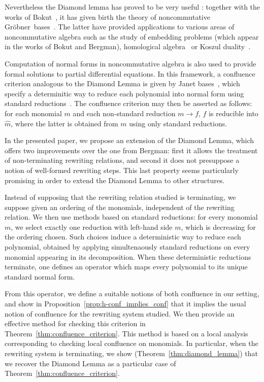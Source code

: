 \documentclass[10pt]{easychair}
\theoremstyle{definition}
\newcommand\G{Gröbner}
\begin{document}
Nevertheless the Diamond lemma has proved to be very useful : together with the works of Bokut~\cite{MR0506423}, it has given birth the theory of noncommutative \G\ bases~\cite{MR1299371}. The latter have provided applications to various areas of noncommutative algebra such as the study of embedding problems (which appear in the works of Bokut and Bergman), homological algebra~\cite{MR1072284, MR2110434} or Koszul duality~\cite{MR1832913, MR0265437}.

Computation of normal forms in noncommutative algebra is also used to provide formal solutions to partial differential equations. In this framework, a confluence criterion analogous to the Diamond Lemma is given by Janet bases~\cite{MR2394773}, which specify a determinitic way to reduce each polynomial into normal form using standard reductions~\cite{Mell}. The confluence criterion may then be asserted as follows: for each monomial $m$ and each non-standard reduction $m\to f$, $f$ is reducible into $\widehat{m}$, where the latter is obtained from $m$ using only standard reductions.

In the presented paper, we propose an extension of the Diamond Lemma, which offers two improvements over the one from Bergman: first it allows the treatment of non-terminating rewriting relations, and second it does not presuppose a notion of well-formed rewriting steps. This last property seems particularly promising in order to extend the Diamond Lemma to other structures.

Instead of supposing that the rewriting relation studied is terminating, we suppose given an ordering of the monomials, independent of the rewriting relation.
We then use methods based on standard reductions: for every monomial $m$, we select exactly one reduction with left-hand side $m$, which is decreasing for the ordering chosen. Such choices induce a deterministic way to reduce each polynomial, obtained by applying simultenaously standard reductions on every monomial appearing in its decomposition. When these deterministic reductions terminate, one defines an operator which maps every polynomial to its unique standard normal form.

From this operator, we define a suitable notions of both confluence in our setting, and show in Proposition~\ref{prop:h-conf_implies_conf} that it implies the usual notion of confluence for the rewriting system studied. We then provide an effective method for checking this criterion in  Theorem~\ref{thm:confluence_criterion}. This method is based on a local analysis corresponding to checking local confluence on monomials. In particular, when the rewriting system is terminating, we show (Theorem~\ref{thm:diamond_lemma}) that we recover the Diamond Lemma as a particular case of Theorem~\ref{thm:confluence_criterion}.
\end{document}
